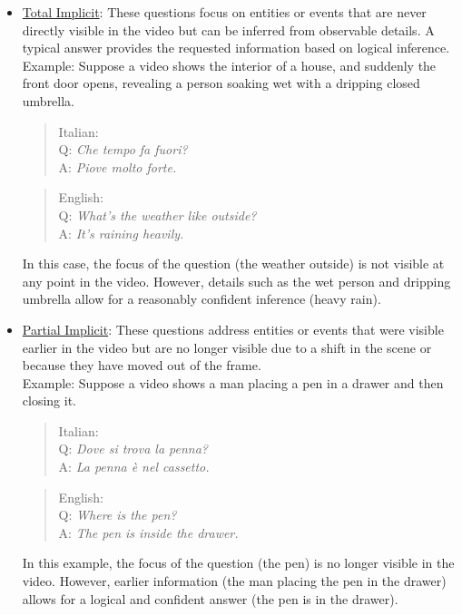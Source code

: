 \begin{itemize}
    \item \underline{Total Implicit}:
These questions focus on entities or events that are never directly visible in the video but can be inferred from observable details. A typical answer provides the requested information based on logical inference.\\
Example: Suppose a video shows the interior of a house, and suddenly the front door opens, revealing a person soaking wet with a dripping closed umbrella.

\begin{quote}
   Italian: \\     
Q: \textit{Che tempo fa fuori?}\\
A: \textit{Piove molto forte.}\\

    \end{quote}


\begin{quote}
   English: \\     
Q: \textit{What’s the weather like outside?}\\
A: \textit{It’s raining heavily.}\\

    \end{quote}
In this case, the focus of the question (the weather outside) is not visible at any point in the video. However, details such as the wet person and dripping umbrella allow for a reasonably confident inference (heavy rain).

    \item \underline{Partial Implicit}:
These questions address entities or events that were visible earlier in the video but are no longer visible due to a shift in the scene or because they have moved out of the frame.\\
Example: Suppose a video shows a man placing a pen in a drawer and then closing it.

\begin{quote}
    Italian: \\   
Q: \textit{Dove si trova la penna?}\\
A: \textit{La penna è nel cassetto.}\\

    \end{quote}

\begin{quote}
    English: \\   
Q: \textit{Where is the pen?}\\
A: \textit{The pen is inside the drawer.}\\

    \end{quote}
In this example, the focus of the question (the pen) is no longer visible in the video. However, earlier information (the man placing the pen in the drawer) allows for a logical and confident answer (the pen is in the drawer).
\end{itemize}




